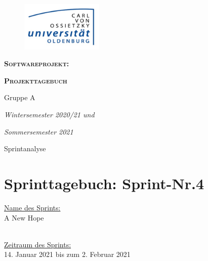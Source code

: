\documentclass[12pt,a4paper, oneside]{article}
\author{Uni Oldenburg, SWP2020 Gruppe A}
\begin{document}
    \begin{titlepage}
        \pagestyle{empty}
        \begin{center}

            \begin{figure}[h]
                \centering
                \includegraphics[width=0.35\textwidth]{img/Logo.jpg}
            \end{figure}

            \bigskip \bigskip \noindent
            \textsc{\textbf{\LARGE Softwareprojekt:}} \par \bigskip \noindent
            \textsc{\textbf{\LARGE Projekttagebuch}}


            \par \bigskip \bigskip \bigskip \bigskip \bigskip \noindent
            {\Large Gruppe A} \par \medskip \noindent

            \par \bigskip \bigskip \bigskip \bigskip \bigskip \bigskip \noindent
            \textit{\Large Wintersemester 2020/21 und} \par \noindent
            \textit{\Large Sommersemester 2021}

            \par \bigskip \bigskip \bigskip \bigskip \bigskip \bigskip \noindent
            \par \bigskip \bigskip \bigskip \noindent
            {\Large Sprintanalyse} \par \medskip \noindent

        \end{center}
    \end{titlepage}

    \tableofcontents
    \pagebreak


    \section{Sprinttagebuch: Sprint-Nr.4}
    \underline{Name des Sprints:}
    \\
    A New Hope

    \noindent
    \\
    \underline{Zeitraum des Sprints:}
    \\
    14. Januar 2021 bis zum 2. Februar 2021
\end{document}

